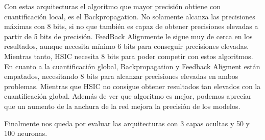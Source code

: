 Con estas arquitecturas el algoritmo que mayor precisión obtiene con cuantificación local, es el Backpropagation. No solamente alcanza las precisiones máximas con 8 bits, si no que también es capaz de obtener precisiones elevadas a partir de 5 bits de precisión. FeedBack Alignmente le sigue muy de cerca en los resultados, aunque necesita mínimo 6 bits para conseguir precisiones elevadas. Mientras tanto, HSIC necesita 8 bits para poder competir con estos algoritmos. En cuanto a la cuantificación global, Backpropagation y Feedback Aligment están empatados, necesitando 8 bits para alcanzar precisiones elevadas en ambos problemas. Mientras que HSIC no consigue obtener resultados tan elevados con la cuantificación global. Además de ver que algoritmo es mejor, podemos apreciar que un aumento de la anchura de la red mejora la precisión de los modelos.

Finalmente nos queda por evaluar las arquitecturas con 3 capas ocultas y 50 y 100 neuronas.

